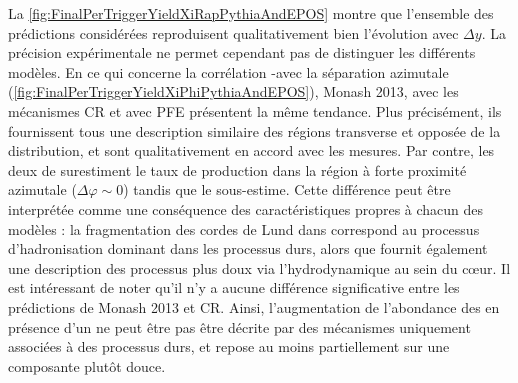 La \fig\ref{fig:FinalPerTriggerYieldXiRapPythiaAndEPOS} montre que l'ensemble des prédictions considérées reproduisent qualitativement bien l'évolution avec $\Delta y$. La précision expérimentale ne permet cependant pas de distinguer les différents modèles. En ce qui concerne la corrélation \rmXiPM-\rmPhiMes avec la séparation azimutale (\fig\ref{fig:FinalPerTriggerYieldXiPhiPythiaAndEPOS}), \Pythiaeight Monash 2013, \Pythiaeight avec les mécanismes CR et \EposFour avec PFE présentent la même tendance. Plus précisément, ils fournissent tous une description similaire des régions transverse et opposée de la distribution, et sont qualitativement en accord avec les mesures. Par contre, les deux  de \Pythiaeight surestiment le taux de production dans la région à forte proximité azimutale ($\Delta \varphi \sim 0$) tandis que \EposFour le sous-estime. Cette différence peut être interprétée comme une conséquence des caractéristiques propres à chacun des modèles : la fragmentation des cordes de Lund dans \Pythiaeight correspond au processus d'hadronisation dominant dans les processus durs, alors que \EposFour fournit également une description des processus plus doux via l'hydrodynamique au sein du c\oe{}ur. Il est intéressant de noter qu'il n'y a aucune différence significative entre les prédictions de \Pythiaeight Monash 2013 et \Pythiaeight CR. Ainsi, l'augmentation de l'abondance des \rmPhiMes en présence d'un \rmXiPM ne peut être pas être décrite par des mécanismes uniquement associées à des processus durs, et repose au moins partiellement sur une composante plutôt douce.\\


